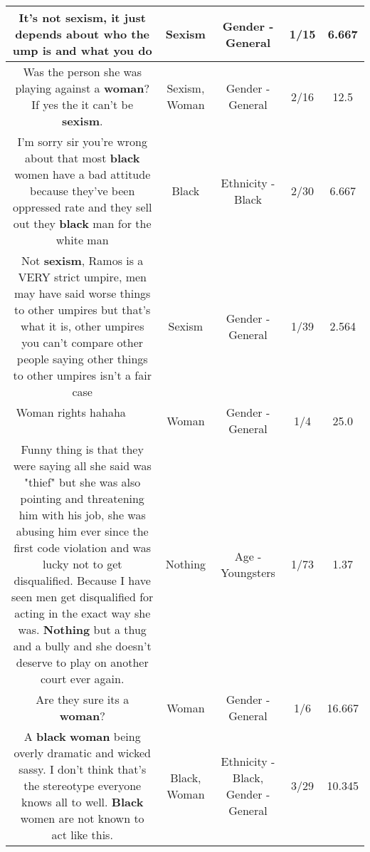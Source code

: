 \documentclass[11pt]{article}
\newlength\mylength
\begin{document}
\begin{center}
\begin{longtable}{|C{.65\mylength}|C{.30\mylength}|C{.12\mylength}|C{.12\mylength}|C{.12\mylength}|}
  \small It's not \textbf{sexism}, it just depends about who the ump is and what you do\normalsize   & Sexism & Gender - General & 1/15 & 6.667 \\  \hline
  \small Was the person she was playing against a \textbf{woman}? If yes the it can't be \textbf{sexism}.\normalsize   & Sexism, Woman & Gender - General & 2/16 & 12.5 \\  \hline
  \small I'm sorry sir you're wrong about that most \textbf{black} women have a bad attitude because they've been oppressed rate and they sell out they \textbf{black} man for the white man\normalsize   & Black & Ethnicity - Black & 2/30 & 6.667 \\  \hline
  \small Not \textbf{sexism}, Ramos is a VERY strict umpire, men may have said worse things to other umpires but that's what it is, other umpires you can't compare other people saying other things to other umpires isn't a fair case\normalsize   & Sexism & Gender - General & 1/39 & 2.564 \\  \hline
  \small Woman rights hahaha 🤦🏻‍♂️🤦🏻‍♂️🤦🏻‍♂️\normalsize   & Woman & Gender - General & 1/4 & 25.0 \\  \hline
  \small Funny thing is that they were saying all she said was "thief" but she was also pointing and threatening him with his job, she was abusing him ever since the first code violation and was lucky not to get disqualified. Because I have seen men get disqualified for acting in the exact way she was. \textbf{Nothing} but a thug and a bully and she doesn't deserve to play on another court ever again.\normalsize   & Nothing & Age - Youngsters & 1/73 & 1.37 \\  \hline
  \small Are they sure its a \textbf{woman}?\normalsize   & Woman & Gender - General & 1/6 & 16.667 \\  \hline
  \small A \textbf{black} \textbf{woman} being overly dramatic and wicked sassy. I don't think that's the stereotype everyone knows all to well. \textbf{Black} women are not known to act like this.\normalsize   & Black, Woman & Ethnicity - Black, Gender - General & 3/29 & 10.345 \\  \hline

\end{longtable}
\end{center}
\end{document}
